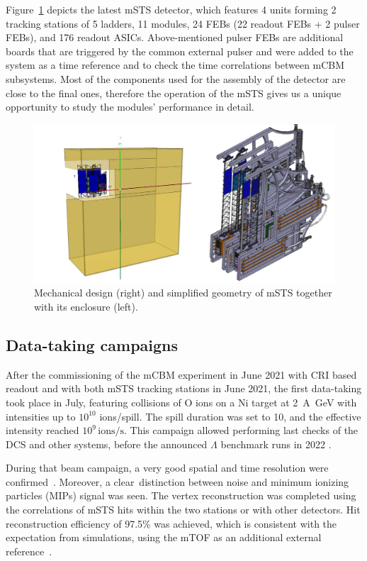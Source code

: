Figure~\ref{fig_mSTS} depicts the latest \gls{mSTS} detector, which features \num{4} units forming \num{2} tracking stations of \num{5} ladders, \num{11} modules, \num{24} \glspl{FEB} (\num{22} readout \glspl{FEB} + \num{2} pulser \glspl{FEB}), and \num{176} readout \glspl{ASIC}. Above-mentioned pulser \glspl{FEB} are additional boards that are triggered by the common external pulser and were added to the system as a time reference and to check the time correlations between \gls{mCBM} subsystems.  Most of the components used for the assembly of the detector are close to the final ones, therefore the operation of the \gls{mSTS} gives us a unique opportunity to study the modules' performance in detail.
\begin{figure}[!h]
\centering
\includegraphics[width=0.75\columnwidth]{Chapter6/DCS/images/mSTS_mech.png}
\caption{Mechanical design (right) and simplified geometry of \gls{mSTS} together with its enclosure (left).}
\label{fig_mSTS}
\end{figure}
\newpage
\subsection{Data-taking campaigns}
After the commissioning of the \gls{mCBM} experiment in June \num{2021} with \gls{CRI} based readout and with both \gls{mSTS} tracking stations in June 2021, the first data-taking took place in July, featuring collisions of O ions on a Ni target at \SI{2}{\A\giga\eV} with intensities up to $10^{10}$ ions/spill. The spill duration was set to \SI{10}{\sec}, and the effective intensity reached $10^{9}\,\mathrm{ions/s}$. This campaign allowed performing last checks of the \gls{DCS} and other systems, before the announced $\Lambda$ benchmark runs in 2022 \cite{sturm3}.

During that beam campaign, a very good spatial and time resolution were confirmed~\cite{dario1}. Moreover, a clear distinction between noise and minimum ionizing particles (\glspl{MIP}) signal was seen.
The vertex reconstruction was completed using the correlations of \gls{mSTS} hits within the two stations or with other detectors. Hit reconstruction efficiency of 97.5\% was achieved, which is consistent with the expectation from simulations, using the mTOF as an additional external reference~\cite{dario1}.

